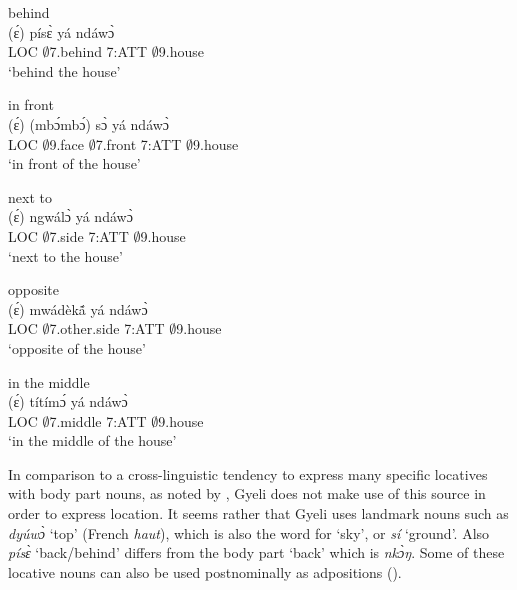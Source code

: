 \begin{exe}
\ex\label{behind} behind \\
  \gll (ɛ́) písɛ̀ yá ndáwɔ̀     \\
           LOC     $\emptyset$7.behind 7:ATT $\emptyset$9.house \\ 
    \trans `behind the house'
\end {exe}

\begin{exe}
\ex\label{front} in front\\
  \gll (ɛ́) (mbɔ́mbɔ́) sɔ̀ yá ndáwɔ̀     \\
           LOC $\emptyset$9.face    $\emptyset$7.front 7:ATT $\emptyset$9.house \\ 
    \trans `in front of the house'
\end {exe}

\begin{exe}
\ex\label{next} next to \\
  \gll (ɛ́) ngwálɔ̀ yá ndáwɔ̀     \\
           LOC  $\emptyset$7.side 7:ATT $\emptyset$9.house \\
    \trans `next to the house'
\end {exe}

\begin{exe}
\ex\label{opposite} opposite \\
  \gll (ɛ́) mwádèkã́  yá ndáwɔ̀     \\
           LOC $\emptyset$7.other.side 7:ATT $\emptyset$9.house \\ 
    \trans `opposite of the house'
\end {exe}

\begin{exe}
\ex\label{middle} in the middle\\
  \gll (ɛ́) títímɔ́  yá ndáwɔ̀     \\
           LOC  $\emptyset$7.middle 7:ATT $\emptyset$9.house \\ 
    \trans `in the middle of the house'
\end {exe}

In comparison to a cross-linguistic tendency to express many specific locatives with body part nouns, as noted by \citet{wilkins96}, Gyeli does not make use of this source in order to express location. It seems rather that Gyeli uses landmark nouns such as {\itshape dyúwɔ̀} `top' (French {\itshape haut}), which is also the word for `sky', or {\itshape sí} `ground'. Also {\itshape písɛ̀} `back/behind' differs from the body part `back' which is {\itshape nkɔ̀ŋ}. Some of these locative nouns can also be used postnominally as adpositions ().



